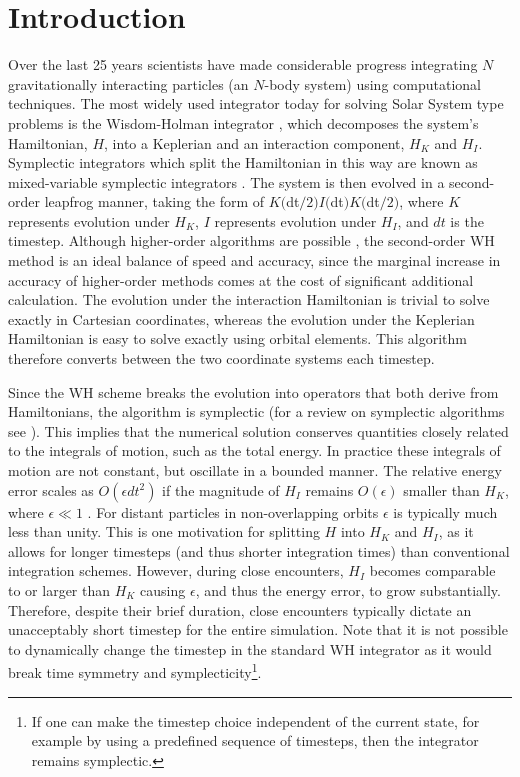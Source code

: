 \section{Introduction}
\label{sec:intro}
Over the last 25 years scientists have made considerable progress integrating $N$ gravitationally interacting particles (an $N$-body system) using computational techniques. 
The most widely used integrator today for solving Solar System type problems is the Wisdom-Holman integrator \citep[hereafter WH]{Wisdom1991}, which decomposes the system's Hamiltonian, $H$, into a Keplerian and an interaction component, $H_K$ and $H_I$. 
Symplectic integrators which split the Hamiltonian in this way are known as mixed-variable symplectic integrators \citep{Wisdom1991, Saha1992}.
The system is then evolved in a second-order leapfrog manner, taking the form of $K($dt$/2) I($dt$) K($dt$/2)$, where $K$ represents evolution under $H_K$, $I$ represents evolution under $H_I$, and $dt$ is the timestep.
Although higher-order algorithms are possible \citep[e.g.][]{Yoshida1990}, the second-order WH method is an ideal balance of speed and accuracy, since the marginal increase in accuracy of higher-order methods comes at the cost of significant additional calculation. 
The evolution under the interaction Hamiltonian is trivial to solve exactly in Cartesian coordinates, whereas the evolution under the Keplerian Hamiltonian is easy to solve exactly using orbital elements. 
This algorithm therefore converts between the two coordinate systems each timestep.

Since the WH scheme breaks the evolution into operators that both derive from Hamiltonians, the algorithm is symplectic (for a review on symplectic algorithms see \citet{Yoshida1993}).
This implies that the numerical solution conserves quantities closely related to the integrals of motion, such as the total energy. 
In practice these integrals of motion are not constant, but oscillate in a bounded manner.
The relative energy error scales as $O(\epsilon dt^2)$ if the magnitude of $H_I$ remains $O(\epsilon)$ smaller than $H_K$, where $\epsilon \ll 1$ \citep{Saha1994}. 
For distant particles in non-overlapping orbits $\epsilon$ is typically much less than unity.
This is one motivation for splitting $H$ into $H_K$ and $H_I$, as it allows for longer timesteps (and thus shorter integration times) than conventional integration schemes. 
However, during close encounters, $H_I$ becomes comparable to or larger than $H_K$ causing $\epsilon$, and thus the energy error, to grow substantially. 
Therefore, despite their brief duration, close encounters typically dictate an unacceptably short timestep for the entire simulation. 
Note that it is not possible to dynamically change the timestep in the standard WH integrator as it would break time symmetry and symplecticity\footnote{If one can make the timestep choice independent of the current state, for example by using a predefined sequence of timesteps, then the integrator remains symplectic.}.

